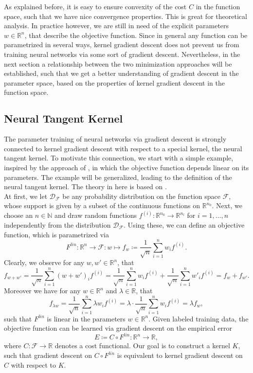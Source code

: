 \documentclass[11pt, a4paper]{article}
\newcommand{\N}{\mathbb{N}}
\newcommand{\R}{\mathbb{R}}
\newcommand{\D}{\mathcal{D}}
\newcommand{\F}{\mathcal{F}}
\begin{document}
As explained before, it is easy to ensure convexity of the cost $C$ in the function space, such that we have nice convergence properties. This is great for theoretical analysis. In practice however, we are still in need of the explicit parameters $w \in \R^n$, that describe the objective function. Since in general any function can be parametrized in several ways, kernel gradient descent does not prevent us from training neural networks via some sort of gradient descent. Nevertheless, in the next section a relationship between the two minimization approaches will be established, such that we get a better understanding of gradient descent in the parameter space, based on the properties of kernel gradient descent in the function space.

\subsection{Neural Tangent Kernel}

The parameter training of neural networks via gradient descent is strongly connected to kernel gradient descent with respect to a special kernel, the neural tangent kernel. To motivate this connection, we start with a simple example, inspired by the approach of \cite{Features}, in which the objective function depends linear on its parameters. The example will be generalized, leading to the definition of the neural tangent kernel. The theory in here is based on \cite{NTK}. \\

At first, we let $\D_{\F}$ be any probability distribution on the function space $\F$, whose support is given by a subset of the continuous functions on $\R^{n_0}$. Next, we choose an $n \in \N$ and draw random functions $f^{(i)} : \R^{n_0} \to \R^{n_l}$ for $i=1,\dots,n$ independently from the distribution $\D_{\F}$. Using these, we can define an objective function, which is parametrized via
\[ F^\textit{lin}: \R^n \to \F : w \mapsto f_w \coloneq \frac{1}{\sqrt{n}} \sum_{i=1}^{n}w_if^{(i)}. \]
Clearly, we observe for any $w, w' \in \R^n$, that
\[ f_{w + w'} = \frac{1}{\sqrt{n}} \sum_{i=1}^{n}(w+ w')_if^{(i)} = \frac{1}{\sqrt{n}} \sum_{i=1}^{n}w_if^{(i)} + \frac{1}{\sqrt{n}} \sum_{i=1}^{n}w'_if^{(i)} = f_w + f_{w'}. \]
Moreover we have for any $w \in \R^n$ and $\lambda \in \R$, that 
\[ f_{\lambda w} = \frac{1}{\sqrt{n}} \sum_{i=1}^{n}\lambda w_if^{(i)} = \lambda \cdot \frac{1}{\sqrt{n}} \sum_{i=1}^{n} w_if^{(i)} = \lambda f_w, \]
such that $F^\textit{lin}$ is linear in the parameters $w \in \R^n$. Given labeled training data, the objective function can be learned via gradient descent on the empirical error
\[ E \coloneq C \circ F^\textit{lin}: \R^n \to \R, \]
where $C: \F \to \R$ denotes a cost functional. Our goal is to construct a kernel $K$, such that gradient descent on $C \circ F^\textit{lin}$ is equivalent to kernel gradient descent on $C$ with respect to $K$. \\
\end{document}
